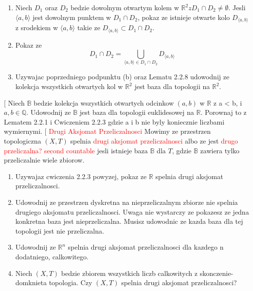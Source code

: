 \documentclass{article}
\makeatletter
\def\myitem{%
   \@ifnextchar[ \@myitem{\@noitemargtrue\@myitem[\@itemlabel]}}
\def\@myitem[#1]{\item[#1]\mbox{}\\}
\makeatother
\begin{document}
\begin{enumerate}[align=left]
        \begin{enumerate}
            \item Niech $D_{1}$ oraz $D_{2}$ bedzie dowolnym otwartym kolem w $\mathbb{R}^{2} z D_{1} \cap D_{2} \neq \emptyset$. Jesli $\langle a, b \rangle$ jest dowolnym punktem w $D_{1} \cap D_{2}$, pokaz ze istnieje otwarte kolo $D_{\langle a,b \rangle}$ z srodekiem w $\langle a,b \rangle$ takie ze $D_{\langle a,b \rangle} \subset D_{1} \cap D_{2}$.
            \item Pokaz ze $$D_{1} \cap D_{2} = \bigcup\limits_{\langle a,b \rangle \in D_{1} \cap D_{2}}D_{\langle a,b \rangle}$$
            \item Uzywajac poprzedniego podpunktu (b) oraz Lematu 2.2.8 udowodnij ze kolekcja wszystkich otwartych kol w $\mathbb{R}^{2}$ jest baza dla topologii na $\mathbb{R}^{2}$.
        \end{enumerate}
        \myitem Niech $\mathbb{B}$ bedzie kolekcja wszystkich otwartych odcinkow $(a,b)$ w $\mathbb{R}$ z a < b, i $a,b \in \mathbb{Q}$. Udowodnij ze $\mathbb{B}$ jest baza dla topologii euklidesowej na $\mathbb{R}$. Porownaj to z Lematem 2.2.1 i Cwiczeniem 2.2.3 gdzie a i b nie byly koniecznie liczbami wymiernymi.
        \myitem \textcolor{red}{Drugi Aksjomat Przeliczalnosci} 
        Mowimy ze przestrzen topologiczna $(X,T)$ spelnia \textcolor{red}{drugi aksjomat przeliczalnosci} albo ze jest \textcolor{red}{drugo przeliczalna? second countable} jesli istnieje baza $\mathbb{B}$ dla $T$, gdzie $\mathbb{B}$ zawiera tylko przeliczalnie wiele zbiorow.

        \begin{enumerate}
            \item Uzywajaz cwiczenia 2.2.3 powyzej, pokaz ze $\mathbb{R}$ spelnia drugi aksjomat przeliczalnosci.
            \item Udowodnij ze przestrzen dyskretna na nieprzeliczalnym zbiorze nie spelnia drugiego aksjomatu przeliczalnosci. Uwaga nie wystarczy ze pokazesz ze jedna konkretna baza jest nieprzeliczalna. Musisz udowodnic ze kazda baza dla tej topologii jest nie przeliczalna.
            \item Udowodnij ze $\mathbb{R}^{n}$ spelnia drugi aksjomat przeliczalnosci dla kazdego n dodatniego, calkowitego.
            \item Niech $(X,T)$ bedzie zbiorem wszystkich liczb calkowitych z skonczenie-domknieta topologia. Czy $(X,T)$ spelnia drugi aksjomat przeliczalnosci?
            

\end{enumerate}
\end{enumerate}
\end{document}
